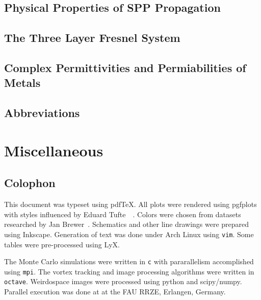 \documentclass[a4paper,titlepage,onecolumn]{report}
\begin{document}
\section{Physical Properties of SPP Propagation}
\label{ref:physicalproperties}
\section{The Three Layer Fresnel System}

\section{Complex Permittivities and Permiabilities of Metals}


\section{Abbreviations}

\chapter{Miscellaneous}
\section{Colophon}
This document was typeset using pdf\TeX. All
plots were rendered using pgfplots~\cite{feuersangerpgfplots} with styles influenced by
Eduard Tufte~\cite{tufte1983visual}~\cite{tufte1991envisioning}. Colors were chosen
from datasets researched by Jan Brewer~\cite{harrower2003colorbrewer}.
Schematics and other line drawings were prepared using Inkscape. Generation
of text was done under Arch Linux using \texttt{vim}.  Some tables were
pre-processed using LyX.

The Monte Carlo simulations were written in \texttt{c} with pararallelism
accomplished using \texttt{mpi}. The vortex tracking and image processing
algorithms were written in \texttt{octave}.  Weirdospace images were
processed using python and scipy/numpy.  Parallel execution was done at at
the FAU RRZE, Erlangen, Germany.

\listoftodos
\end{document}
